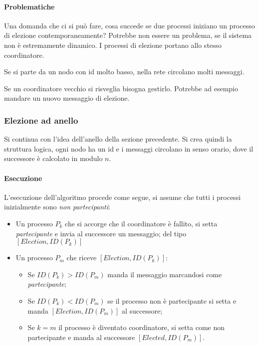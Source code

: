 \paragraph{Problematiche}
Una domanda che ci si può fare, cosa succede se due processi 
iniziano un processo di elezione contemporaneamente?
Potrebbe non essere un problema, se il sistema non è estremamente 
dinamico. I processi di elezione portano allo stesso coordinatore.

Se si parte da un nodo con id molto basso, nella rete circolano 
molti messaggi.

Se un coordinatore vecchio si risveglia bisogna gestirlo. Potrebbe ad 
esempio mandare un nuovo messaggio di elezione.

\subsubsection{Elezione ad anello}

Si continua con l'idea dell'anello della sezione precedente.
Si crea quindi la struttura logica, ogni nodo ha un id e i messaggi 
circolano in senso orario, dove il successore è calcolato in modulo 
$n$.

\paragraph{Esecuzione}
L'esecuzione dell'algoritmo procede come segue, si assume che 
tutti i processi inizialmente sono \emph{non partecipanti}:
\begin{itemize}
    \item Un processo $P_k$ che si accorge che il coordinatore è fallito, 
    si setta \emph{partecipante} e invia al successore un messaggio;
    del tipo $[\mathit{Election}, \mathit{ID}(P_k)]$
    \item Un processo $P_m$ che riceve $[\mathit{Election}, \mathit{ID}(P_k)]$:
    \begin{itemize}
        \item Se $\mathit{ID}(P_k) > \mathit{ID}(P_m)$ manda il messaggio 
        marcandosi come \emph{partecipante};
        \item Se $\mathit{ID}(P_k) < \mathit{ID}(P_m)$ se il processo 
        non è partecipante si setta e manda $[\mathit{Election}, \mathit{ID}(P_m)]$
        al successore;
        \item Se $k = m$ il processo è diventato coordinatore, si setta 
        come non partecipante e manda al successore $[\mathit{Elected}, \mathit{ID}(P_m)]$.
    \end{itemize}
\end{itemize}

